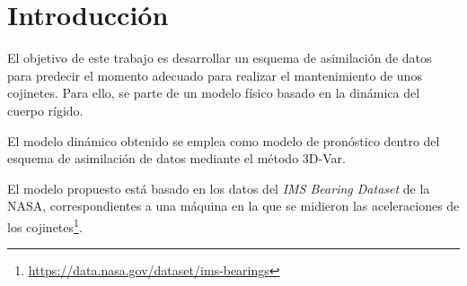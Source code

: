 \section{Introducción}

El objetivo de este trabajo es desarrollar un esquema de asimilación de datos para predecir el momento adecuado para realizar el mantenimiento de unos cojinetes. Para ello, se parte de un modelo físico basado en la dinámica del cuerpo rígido.

El modelo dinámico obtenido se emplea como modelo de pronóstico dentro del esquema de asimilación de datos mediante el método 3D-Var.


El modelo propuesto está basado en los datos del \emph{IMS Bearing Dataset} de la NASA, correspondientes a 
una máquina en la que se midieron las aceleraciones de los cojinetes\footnote{\url{https://data.nasa.gov/dataset/ims-bearings}}.
